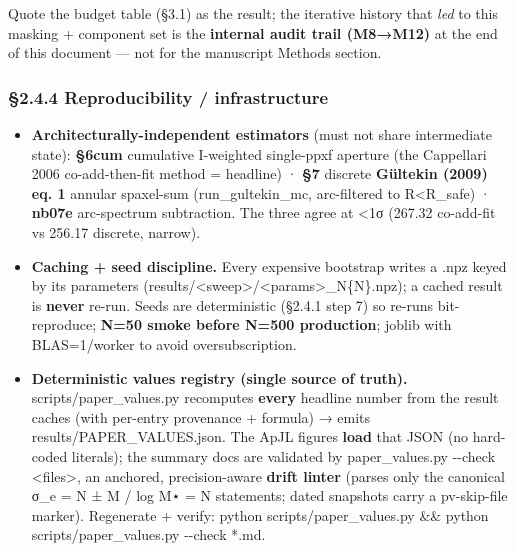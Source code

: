 \documentclass[
]{article}
\providecommand{\tightlist}{%
  \setlength{\itemsep}{0pt}\setlength{\parskip}{0pt}}
\newcommand{\BreakablePath}[1]{{\ttfamily\sloppy #1}}
\begin{document}
Quote the budget table (§3.1) as the result; the iterative history that
\emph{led} to this masking + component set is the \textbf{internal audit
trail (M8→M12)} at the end of this document --- not for the manuscript
Methods section.

\hypertarget{reproducibility-infrastructure}{%
\subsubsection{§2.4.4 Reproducibility /
infrastructure}\label{reproducibility-infrastructure}}

\begin{itemize}
\tightlist
\item
  \textbf{Architecturally-independent estimators} (must not share
  intermediate state): \textbf{§6cum} cumulative I-weighted single-ppxf
  aperture (the Cappellari 2006 co-add-then-fit method = headline) ·
  \textbf{§7} discrete \textbf{Gültekin (2009) eq. 1} annular spaxel-sum
  (\BreakablePath{run\_\discretionary{}{}{}gultekin\_\discretionary{}{}{}mc},
  arc-filtered to R\textless R\_safe) · \textbf{nb07e} arc-spectrum
  subtraction. The three agree at \textless1σ (267.32 co-add-fit vs
  256.17 discrete, narrow).
\item
  \textbf{Caching + seed discipline.} Every expensive bootstrap writes a
  \BreakablePath{.\discretionary{}{}{}npz} keyed by its parameters
  (\BreakablePath{results/\discretionary{}{}{}<sweep>/\discretionary{}{}{}<params>\_\discretionary{}{}{}N\{N\}.\discretionary{}{}{}npz});
  a cached result is \textbf{never} re-run. Seeds are deterministic
  (§2.4.1 step 7) so re-runs bit-reproduce; \textbf{N=50 smoke before
  N=500 production}; joblib with BLAS=1/worker to avoid
  oversubscription.
\item
  \textbf{Deterministic values registry (single source of truth).}
  \BreakablePath{scripts/\discretionary{}{}{}paper\_\discretionary{}{}{}values.\discretionary{}{}{}py}
  recomputes \textbf{every} headline number from the result caches (with
  per-entry provenance + formula) → emits
  \BreakablePath{results/\discretionary{}{}{}PAPER\_\discretionary{}{}{}VALUES.\discretionary{}{}{}json}.
  The ApJL figures \textbf{load} that JSON (no hard-coded literals); the
  summary docs are validated by
  \BreakablePath{paper\_\discretionary{}{}{}values.\discretionary{}{}{}py -\discretionary{}{}{}-\discretionary{}{}{}check <files>},
  an anchored, precision-aware \textbf{drift linter} (parses only the
  canonical \BreakablePath{σ\_\discretionary{}{}{}e = N ± M} /
  \BreakablePath{log M⋆ = N} statements; dated snapshots carry a
  \BreakablePath{pv-\discretionary{}{}{}skip-\discretionary{}{}{}file}
  marker). Regenerate + verify:
  \BreakablePath{python scripts/\discretionary{}{}{}paper\_\discretionary{}{}{}values.\discretionary{}{}{}py \&\& python scripts/\discretionary{}{}{}paper\_\discretionary{}{}{}values.\discretionary{}{}{}py -\discretionary{}{}{}-\discretionary{}{}{}check *.\discretionary{}{}{}md}.
\end{itemize}
\end{document}

